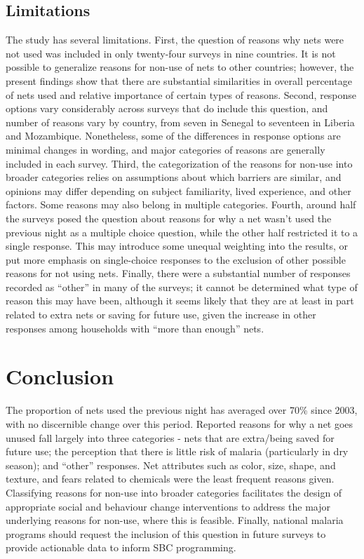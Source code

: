 \documentclass[review,
3p]{elsarticle} %
\begin{document}
\hypertarget{limitations}{%
\subsection{Limitations}\label{limitations}}

The study has several limitations. First, the question of reasons why
nets were not used was included in only twenty-four surveys in nine
countries. It is not possible to generalize reasons for non-use of nets
to other countries; however, the present findings show that there are
substantial similarities in overall percentage of nets used and relative
importance of certain types of reasons. Second, response options vary
considerably across surveys that do include this question, and number of
reasons vary by country, from seven in Senegal to seventeen in Liberia
and Mozambique. Nonetheless, some of the differences in response options
are minimal changes in wording, and major categories of reasons are
generally included in each survey. Third, the categorization of the
reasons for non-use into broader categories relies on assumptions about
which barriers are similar, and opinions may differ depending on subject
familiarity, lived experience, and other factors. Some reasons may also
belong in multiple categories. Fourth, around half the surveys posed the
question about reasons for why a net wasn't used the previous night as a
multiple choice question, while the other half restricted it to a single
response. This may introduce some unequal weighting into the results, or
put more emphasis on single-choice responses to the exclusion of other
possible reasons for not using nets. Finally, there were a substantial
number of responses recorded as ``other'' in many of the surveys; it
cannot be determined what type of reason this may have been, although it
seems likely that they are at least in part related to extra nets or
saving for future use, given the increase in other responses among
households with ``more than enough'' nets.

\hypertarget{conclusion}{%
\section{Conclusion}\label{conclusion}}

The proportion of nets used the previous night has averaged over 70\%
since 2003, with no discernible change over this period. Reported
reasons for why a net goes unused fall largely into three categories -
nets that are extra/being saved for future use; the perception that
there is little risk of malaria (particularly in dry season); and
``other'' responses. Net attributes such as color, size, shape, and
texture, and fears related to chemicals were the least frequent reasons
given. Classifying reasons for non-use into broader categories
facilitates the design of appropriate social and behaviour change
interventions to address the major underlying reasons for non-use, where
this is feasible. Finally, national malaria programs should request the
inclusion of this question in future surveys to provide actionable data
to inform SBC programming.
\end{document}
